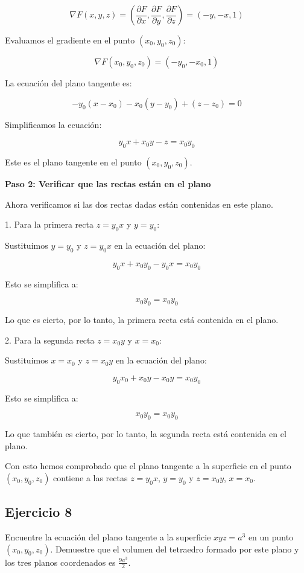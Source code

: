 \documentclass{report}
\begin{document}
    \[
    \nabla F(x, y, z) = \left( \frac{\partial F}{\partial x}, \frac{\partial F}{\partial y}, \frac{\partial F}{\partial z} \right) = (-y, -x, 1)
    \]

    Evaluamos el gradiente en el punto \( (x_0, y_0, z_0) \):

    \[
    \nabla F(x_0, y_0, z_0) = (-y_0, -x_0, 1)
    \]

    La ecuación del plano tangente es:

    \[
    -y_0 (x - x_0) - x_0 (y - y_0) + (z - z_0) = 0
    \]

    Simplificamos la ecuación:

    \[
    y_0 x + x_0 y - z = x_0 y_0
    \]

    Este es el plano tangente en el punto \( (x_0, y_0, z_0) \).

    \textbf{Paso 2: Verificar que las rectas están en el plano}

    Ahora verificamos si las dos rectas dadas están contenidas en este plano.

    1. Para la primera recta \( z = y_0 x \) y \( y = y_0 \):

    Sustituimos \( y = y_0 \) y \( z = y_0 x \) en la ecuación del plano:

    \[
    y_0 x + x_0 y_0 - y_0 x = x_0 y_0
    \]

    Esto se simplifica a:

    \[
    x_0 y_0 = x_0 y_0
    \]

    Lo que es cierto, por lo tanto, la primera recta está contenida en el plano.

    2. Para la segunda recta \( z = x_0 y \) y \( x = x_0 \):

    Sustituimos \( x = x_0 \) y \( z = x_0 y \) en la ecuación del plano:

    \[
    y_0 x_0 + x_0 y - x_0 y = x_0 y_0
    \]

    Esto se simplifica a:

    \[
    x_0 y_0 = x_0 y_0
    \]

    Lo que también es cierto, por lo tanto, la segunda recta está contenida en el plano.

    Con esto hemos comprobado que el plano tangente a la superficie en el punto \( (x_0, y_0, z_0) \) contiene a las rectas \( z = y_0 x \), \( y = y_0 \) y \( z = x_0 y \), \( x = x_0 \).\subsection*{Ejercicio 8}
    Encuentre la ecuación del plano tangente a la superficie $xyz = a^3$ en un punto $(x_0, y_0, z_0)$. Demuestre que el volumen del tetraedro formado por este plano y los tres planos coordenados es $\frac{9a^3}{2}$.
\end{document}
